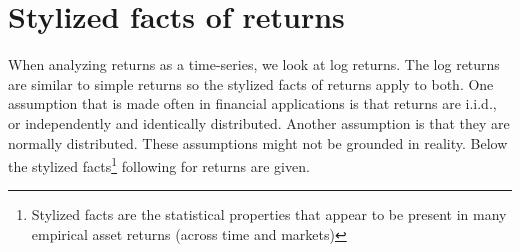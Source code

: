 \documentclass[a4paper, nobind]{templates/ociamthesis}
\begin{document}
\minitoc 

\hypertarget{styl-facts}{%
\section{Stylized facts of returns}\label{styl-facts}}

\noindent When analyzing returns as a time-series, we look at log returns. The log returns are similar to simple returns so the stylized facts of returns apply to both. One assumption that is made often in financial applications is that returns are i.i.d., or independently and identically distributed. Another assumption is that they are normally distributed. These assumptions might not be grounded in reality. Below the stylized facts\footnote{Stylized facts are the statistical properties that appear to be present in many empirical asset returns (across time and markets)} following \textcite{annaert2021} for returns are given.
\end{document}
